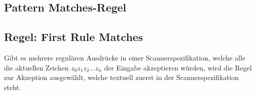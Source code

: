 \subsection*{Pattern Matches-Regel}
\subsection*{Regel: First Rule Matches}
Gibt es mehrere regulären Ausdrücke in einer Scannerspezifikation, welche alle die aktuellen Zeichen $z_0z_1z_2 . . . z_n$ der Eingabe akzeptieren würden, wird
die Regel zur Akzeption ausgewählt, welche textuell zuerst in der Scannerspezifikation steht.

